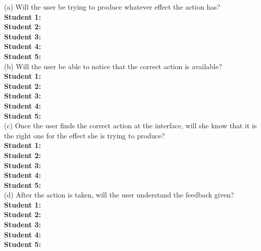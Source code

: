 \documentclass[pdftex,12pt,a4paper]{report}
\begin{document}
\noindent(a) Will the user be trying to produce whatever effect the action has?
\\\indent \textbf{Student 1:} 
\\\indent \textbf{Student 2:} 
\\\indent \textbf{Student 3:} 
\\\indent \textbf{Student 4:} 
\\\indent \textbf{Student 5:} 
\\(b) Will the user be able to notice that the correct action is available?
\\\indent \textbf{Student 1:} 
\\\indent \textbf{Student 2:} 
\\\indent \textbf{Student 3:} 
\\\indent \textbf{Student 4:} 
\\\indent \textbf{Student 5:} 
\\(c) Once the user finds the correct action at the interface, will she know that it is the right one for the effect she is trying to produce?
\\\indent \textbf{Student 1:} 
\\\indent \textbf{Student 2:} 
\\\indent \textbf{Student 3:} 
\\\indent \textbf{Student 4:} 
\\\indent \textbf{Student 5:} 
\\(d) After the action is taken, will the user understand the feedback given?
\\\indent \textbf{Student 1:} 
\\\indent \textbf{Student 2:} 
\\\indent \textbf{Student 3:} 
\\\indent \textbf{Student 4:} 
\\\indent \textbf{Student 5:} 
\end{document}
